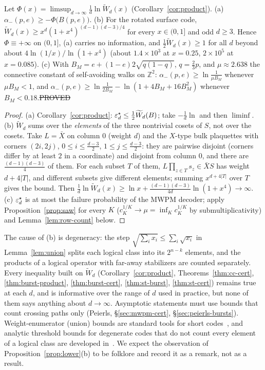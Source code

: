 \begin{proposition}\label{prop:lower}
Let $\Phi(x)=\limsup_{d\to\infty}\tfrac1d\ln\widetilde W_d(x)$ (Corollary~\ref{cor:product}).
(a) $\alpha_-(p,e)\ge-\Phi\big(B(p,e)\big)$.
(b) For the rotated surface code, $\widetilde W_d(x)\ge x^d(1+x^4)^{(d-1)(d-3)/4}$ for every $x\in(0,1]$ and odd $d\ge3$. Hence $\Phi\equiv+\infty$ on $(0,1]$, (a) carries no information, and $\tfrac12\widetilde W_d(x)\ge1$ for all $d$ beyond about $4\ln(1/x)/\ln(1+x^4)$ (about $1.4\times10^3$ at $x=0.25$, $2\times10^5$ at $x=0.085$).
(c) With $B_M=e+(1-e)2\sqrt{q(1-q)}$, $q=\tfrac23p$, and $\mu\approx2.638$ the connective constant of self-avoiding walks on $\mathbb Z^2$: $\alpha_-(p,e)\ge\ln\frac1{\mu B_M}$ whenever $\mu B_M<1$, and $\alpha_-(p,e)\ge\ln\frac1{2B_M}-\ln(1+4B_M+16B_M^2)$ whenever $B_M<0.18$.\hfill\st{PROVED}
\end{proposition}
\begin{proof}
(a) Corollary~\ref{cor:product}: $\varepsilon^{\star}_d\le\tfrac12\widetilde W_d(B)$; take $-\tfrac1d\ln$ and then $\liminf$.
(b) $\widetilde W_d$ sums over the \emph{elements} of the three nontrivial cosets of $S$, not over the cosets. Take $L=\bar X$ on column $0$ (weight $d$) and the $X$-type bulk plaquettes with corners $(2i,2j)$, $0\le i\le\frac{d-3}2$, $1\le j\le\frac{d-3}2$: they are pairwise disjoint (corners differ by at least $2$ in a coordinate) and disjoint from column $0$, and there are $\frac{(d-1)(d-3)}4$ of them. For each subset $T$ of them, $L\prod_{z\in T}s_z\in\bar XS$ has weight $d+4|T|$, and different subsets give different elements; summing $x^{d+4|T|}$ over $T$ gives the bound. Then $\tfrac1d\ln\widetilde W_d(x)\ge\ln x+\tfrac{(d-1)(d-3)}{4d}\ln(1+x^4)\to\infty$.
(c) $\varepsilon^{\star}_d$ is at most the failure probability of the MWPM decoder; apply Proposition~\ref{prop:saw} for every $K$ ($c_K^{1/K}\to\mu=\inf_Kc_K^{1/K}$ by submultiplicativity) and Lemma~\ref{lem:row-count} below.
\end{proof}
\noindent The cause of (b) is degeneracy: the step $\sqrt{\sum_ix_i}\le\sum_i\sqrt{x_i}$ in Lemma~\ref{lem:union} splits each logical class into its $2^{n-k}$ elements, and the products of a logical operator with far-away stabilizers are counted separately. Every inequality built on $\widetilde W_d$ (Corollary~\ref{cor:product}, Theorems~\ref{thm:cc-cert}, \ref{thm:burst-product}, \ref{thm:burst-cert}, \ref{thm:st-burst}, \ref{thm:st-cert}) remains true at each $d$, and is informative over the range of $d$ used in practice, but none of them says anything about $d\to\infty$. Asymptotic statements must use bounds that count crossing paths only (Peierls, \S\ref{sec:mwpm-cert}, \S\ref{sec:peierls-bursts}).
Weight-enumerator (union) bounds are standard tools for short codes~\cite{FVC}, and analytic threshold bounds for degenerate codes that do not count every element of a logical class are developed in~\cite{KPDP,DKP}. We expect the observation of Proposition~\ref{prop:lower}(b) to be folklore and record it as a remark, not as a result.

